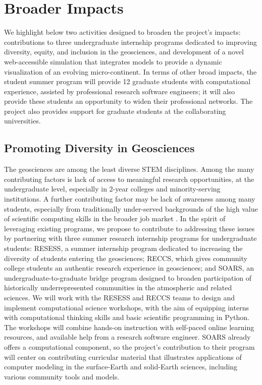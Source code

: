 \section{Broader Impacts}
\label{sec:broader-impacts}

We highlight below two activities designed to broaden the project's impacts: contributions to three undergraduate internship programs dedicated to improving diversity, equity, and inclusion in the geosciences, and development of a novel web-accessible simulation that integrates models to provide a dynamic visualization of an evolving micro-continent. In terms of other broad impacts, the student summer program will provide 12 graduate students with computational experience, assisted by professional research software engineers; it will also provide these students an opportunity to widen their professional networks. The project also provides support for graduate students at the collaborating universities.

\subsection{Promoting Diversity in Geosciences}
\label{sec:promoting-diversity}

The geosciences are among the least diverse STEM disciplines. Among the many contributing factors is lack of access to meaningful research opportunities, at the undergraduate level, especially in 2-year colleges and minority-serving institutions. A further contributing factor may be lack of awareness among many students, especially from traditionally under-served backgrounds of the high value of scientific computing skills in the broader job market \citep{bernard2018no}. In the spirit of leveraging existing programs, we propose to contribute to addressing these issues by partnering with three summer research internship programs for undergraduate students: RESESS, a summer internship program dedicated to increasing the diversity of students entering the geosciences; RECCS, which gives community college students an authentic research experience in geosciences; and SOARS, an undergraduate-to-graduate bridge program designed to broaden participation of historically underrepresented communities in the atmospheric and related sciences. We will work with the RESESS and RECCS teams to design and implement computational science workshops, with the aim of equipping interns with computational thinking skills and basic scientific programming in Python. The workshops will combine hands-on instruction with self-paced online learning resources, and available help from a research software engineer. SOARS already offers a computational component, so the project's contribution to their program will center on  contributing curricular material that illustrates applications of computer modeling in the surface-Earth and solid-Earth sciences, including various community tools and models.


